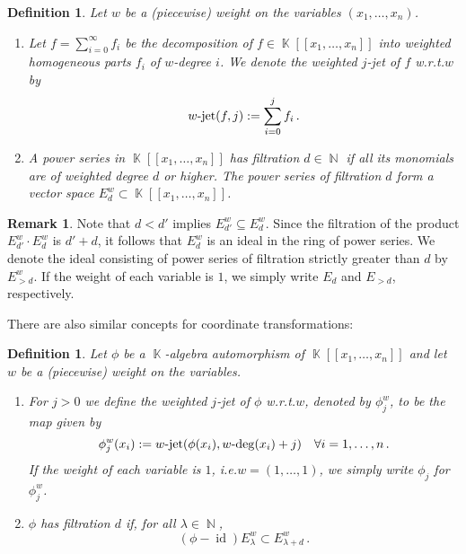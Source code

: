 \documentclass[noend]{amsproc}
\newtheorem{defn}[theorem]{Definition}
\theoremstyle{definition}
\newtheorem{remark}[theorem]{Remark}
\DeclareMathOperator{\N}{\mathbb{N}}
\DeclareMathOperator{\K}{\mathbb{K}}
\DeclareMathOperator{\id}{id}
\DeclareMathOperator{\dash}{\!\textnormal{-}\!}
\DeclareMathOperator{\jet}{jet}
\begin{document}
\begin{defn}
Let $w$ be a (piecewise) weight on the variables $(x_1,\ldots,x_n)$.

\begin{enumerate}
\item
Let $f = \sum_{i = 0}^{\infty} f_i$ be the decomposition of
$f \in \K[[x_1,\ldots,x_n]]$ into weighted homogeneous parts $f_i$ of
$w$-degree $i$. We denote the weighted $j$-jet of $f$ w.r.t.\@ $w$ by
\[
w \dash \jet(f, j) := \sum_{i = 0}^j f_i \,.
\]

\item
A power series in $\K[[x_1,\ldots,x_n]]$ has filtration $d \in \N$ if all its
monomials are of weighted degree $d$ or higher. The power series of filtration
$d$ form a vector space $E_d^w \subset \K[[x_1,\ldots,x_n]]$.
\end{enumerate}
\end{defn}

\begin{remark}
Note that $d < d'$ implies $E_{d'}^w \subseteq E_d^w$. Since the filtration of
the product $E_{d'}^w \cdot E_d^w$ is $d'+d$, it follows that $E_d^w$ is an
ideal in the ring of power series. We denote the ideal consisting of power
series of filtration strictly greater than $d$ by $E_{>d}^w$. If the weight
of each variable is $1$, we simply write $E_d$ and $E_{>d}$, respectively.
\end{remark}

There are also similar concepts for coordinate transformations:

\begin{defn}\label{def:jet_phi}
Let $\phi$ be a $\K$-algebra automorphism of $\K[[x_1,\ldots,x_n]]$ and let
$w$ be a (piecewise) weight on the variables.

\begin{enumerate}
\item
For $j > 0$ we define the weighted $j$-jet of $\phi$ w.r.t.\@ $w$, denoted by
$\phi_j^w$, to be the map given by
\[
\phi_j^w(x_i) := w\dash\jet(\phi(x_i),w\dash\deg(x_i)+j) \quad
\forall i = 1,\ldots,n \,.
\]
If the weight of each variable is $1$, i.e.\@ $w = (1, \ldots, 1)$, we simply
write $\phi_j$ for $\phi_j^w$.

\item\label{enum:filtration}
$\phi$ has filtration $d$ if, for all $\lambda \in \N$,
\[
(\phi-\id)E_\lambda^w \subset E_{\lambda+d}^w \,.
\]
\end{enumerate}
\end{defn}
\end{document}
